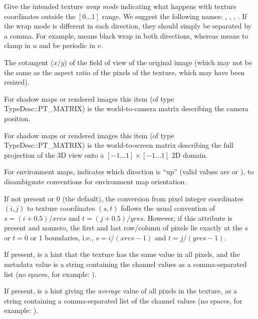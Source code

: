 Give the intended texture \emph{wrap mode} indicating what happens with
texture coordinates outside the $[0...1]$ range.  We suggest the
following names: , , , .
If the wrap mode is different in each direction, they should simply be
separated by a comma.  For example,  means black wrap in both
directions, whereas  means to clamp in $u$ and be
periodic in $v$.
\apiend

The cotangent ($x/y$) of the field of view of the original image (which
may not be the same as the aspect ratio of the pixels of the texture,
which may have been resized).
\apiend

For shadow maps or rendered images this item (of type {\cf TypeDesc::PT_MATRIX})
is the world-to-camera matrix describing the camera position.
\apiend

For shadow maps or rendered images this item (of type {\cf TypeDesc::PT_MATRIX})
is the world-to-screen matrix describing the full projection of the 3D
view onto a $[-1...1] \times [-1...1]$ 2D domain.
\apiend

For environment maps, indicates which direction is ``up'' (valid values
are  or ), to disambiguate conventions for environment map
orientation.
\apiend

If not present or 0 (the default), the conversion from pixel integer
coordinates $(i,j)$ to texture coordinates $(s,t)$ follows the usual
convention of $s = (i+0.5)/\mathit{xres}$ and $t = (j+0.5)/\mathit{yres}$.
However, if this attribute is present and nonzero, the first and last
row/column of pixels lie exactly at the $s$ or $t = 0$ or $1$
boundaries, i.e., $s = i/(\mathit{xres}-1)$ and $t = j/(\mathit{yres}-1)$.
\apiend

If present, is a hint that the texture has the same value in all pixels,
and the metadata value is a string containing the channel values as
a comma-separated list (no spaces, for example: ).
\apiend

If present, is a hint giving the \emph{average} value of all pixels in the
texture, as a string containing a comma-separated list of the channel values
(no spaces, for example: ).
\apiend


